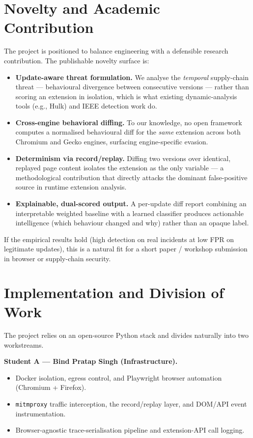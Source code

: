 \documentclass[11pt]{article}
\newcommand{\dem}[1]{\textbf{#1}}
\begin{document}
\section{Novelty and Academic Contribution}
The project is positioned to balance engineering with a defensible research contribution. The
publishable novelty surface is:

\begin{itemize}[leftmargin=1.4em,itemsep=0.25em]
\item \dem{Update-aware threat formulation.} We analyse the \emph{temporal} supply-chain threat ---
behavioural divergence between consecutive versions --- rather than scoring an extension in isolation,
which is what existing dynamic-analysis tools (e.g., Hulk) and IEEE detection work do.
\item \dem{Cross-engine behavioral diffing.} To our knowledge, no open framework computes a normalised
behavioural diff for the \emph{same} extension across both Chromium and Gecko engines, surfacing
engine-specific evasion.
\item \dem{Determinism via record/replay.} Diffing two versions over identical, replayed page content
isolates the extension as the only variable --- a methodological contribution that directly attacks
the dominant false-positive source in runtime extension analysis.
\item \dem{Explainable, dual-scored output.} A per-update diff report combining an interpretable
weighted baseline with a learned classifier produces actionable intelligence (which behaviour changed
and why) rather than an opaque label.
\end{itemize}

If the empirical results hold (high detection on real incidents at low FPR on legitimate updates),
this is a natural fit for a short paper / workshop submission in browser or supply-chain security.

\section{Implementation and Division of Work}
The project relies on an open-source Python stack and divides naturally into two workstreams.

\dem{Student A --- Bind Pratap Singh (Infrastructure).}
\begin{itemize}[leftmargin=1.4em,itemsep=0.1em]
\item Docker isolation, egress control, and Playwright browser automation (Chromium + Firefox).
\item \texttt{mitmproxy} traffic interception, the record/replay layer, and DOM/API event instrumentation.
\item Browser-agnostic trace-serialisation pipeline and extension-API call logging.
\end{itemize}
\end{document}
